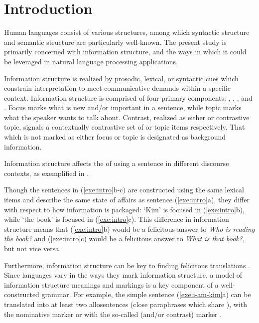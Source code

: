 \chapter{Introduction}
\label{chapter1}
\setcounter{enums}{0}

Human languages consist of various structures, among which syntactic
structure and semantic structure are particularly well-known. The
present study is primarily concerned with information structure, and
the ways in which it could be leveraged in natural language processing
applications.

Information structure is realized by prosodic, lexical, or syntactic
cues which constrain interpretation to meet communicative demands
within a specific context.  Information structure is comprised of four
primary components: , , , and
.  Focus marks what is new and/or important in a
sentence, while topic marks what the speaker wants to talk about.
Contrast, realized as either  or contrastive topic,
signals a contextually contrastive set of  or topic items
respectively. That which is not marked as either focus or topic is
designated as background information.

Information structure affects the  of using a sentence in
different discourse contexts, as exemplified in .




\noindent Though the sentences in (\ref{exe:intro}b-c) are constructed
using the same lexical items and describe the same state of affairs as
sentence (\ref{exe:intro}a), they differ with respect to how
information is packaged: `Kim' is focused in (\ref{exe:intro}b), while
`the book' is focused in (\ref{exe:intro}c). This difference in
information structure means that (\ref{exe:intro}b) would be a
felicitous answer to \textit{Who is reading the book?} and
(\ref{exe:intro}c) would be a felicitous answer to \textit{What is
  that book?}, but not vice versa.


Furthermore, information structure can be key to finding felicitous
translations \citep{paggio:96,kuhn:96}.  Since languages vary in the
ways they mark information structure, a model of information structure
meanings and markings is a key component of a well-constructed
grammar.  For example, the simple  sentence
(\ref{exe:i-am-kim}a) can be translated into at least two
 allosentences (close paraphrases which share
 \citep{lambrecht:96}), with the nominative
marker \ga or with the so-called  (and/or contrast) marker \wa.


